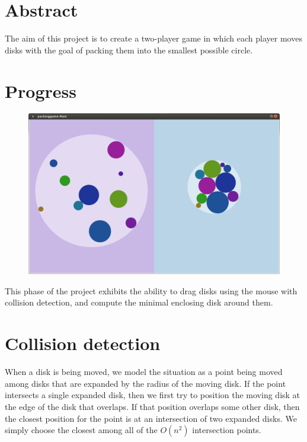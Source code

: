 \documentclass[11pt]{article}
\begin{document}
\section{Abstract}

The aim of this project is to create a two-player game in which
each player moves disks with the goal of packing them into the
smallest possible circle.

\section{Progress}

\begin{figure}
\includegraphics[scale=0.25]{screenshot.png}
\end{figure}

This phase of the project exhibits the ability to drag disks
using the mouse with collision detection, and compute the
minimal enclosing disk around them.

\section{Collision detection}

When a disk is being moved, we model the situation as a point
being moved among disks that are expanded by the radius of the
moving disk.
If the point intersects a single expanded disk, then we first
try to position the moving disk at the edge of the disk that
overlaps.
If that position overlaps some other disk, then the closest
position for the point is at an intersection of two expanded disks.
We simply choose the closest among all of the $O(n^2)$ intersection points.
\end{document}
